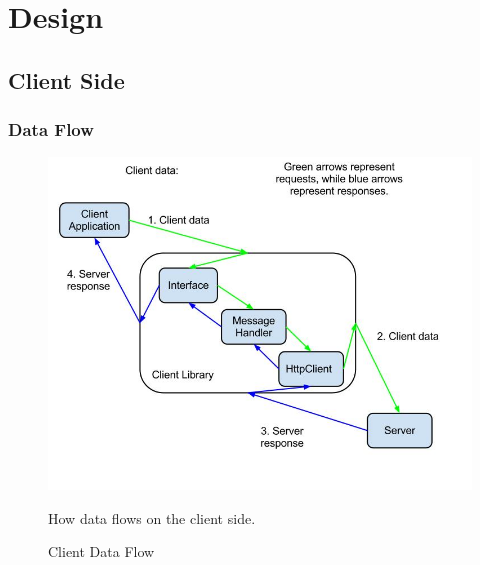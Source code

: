 \documentclass[12pt]{article}
\begin{document}
\section{Design}\label{design}
    \subsection{Client Side}\label{clientdesign}
        \subsubsection{Data Flow}\label{dataflow}
            \begin{figure}[htb]
            \centering
            \includegraphics[scale=0.5]{client_data_flow}
            \caption{Client Data Flow}
            How data flows on the client side.
            \label{fig:clientdata}
        \end{figure}
        
\end{document}
